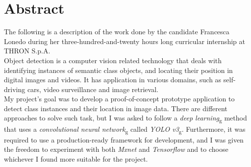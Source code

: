 
\cleardoublepage
{}
{}
\begingroup
\let\clearpage\relax
\let\cleardoublepage\relax
\let\cleardoublepage\relax
{}


\chapter*{Abstract}
The following is a description of the work done by the candidate Francesca Lonedo during her three-hundred-and-twenty hours long curricular internship at THRON S.p.A. \\
Object detection is a computer vision related technology that deals with identifying instances of semantic class objects, and locating their position in digital images and videos. 
It has application in various domains, such as self-driving cars, video surveillance and image retrieval. \\
My project's goal was to develop a proof-of-concept prototype application to detect class instances and their location in image data. There are different approaches to solve such task, but I was asked to follow a \emph{\gls{deep learning}}\textsubscript{g} method that uses a \emph{\gls{convolutional neural network}}\textsubscript{g} called \emph{\gls{YOLO v3}}\textsubscript{g}. Furthermore, it was required to use a production-ready framework for development, and I was given the freedom to experiment with both \emph{Mxnet} and \emph{Tensorflow} and to choose whichever I found more suitable for the project. \\



%

%


\endgroup			

\vfill

